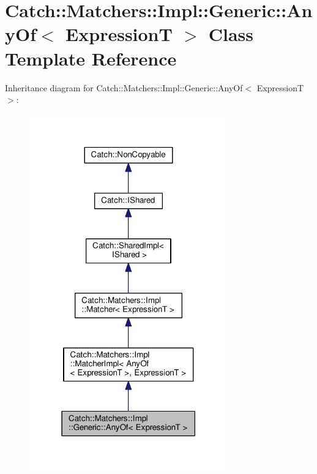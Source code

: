 \hypertarget{classCatch_1_1Matchers_1_1Impl_1_1Generic_1_1AnyOf}{}\section{Catch\+:\+:Matchers\+:\+:Impl\+:\+:Generic\+:\+:Any\+Of$<$ ExpressionT $>$ Class Template Reference}
\label{classCatch_1_1Matchers_1_1Impl_1_1Generic_1_1AnyOf}


Inheritance diagram for Catch\+:\+:Matchers\+:\+:Impl\+:\+:Generic\+:\+:Any\+Of$<$ ExpressionT $>$\+:
\nopagebreak
\begin{figure}[H]
\begin{center}
\leavevmode
\includegraphics[width=243pt]{classCatch_1_1Matchers_1_1Impl_1_1Generic_1_1AnyOf__inherit__graph}
\end{center}
\end{figure}


